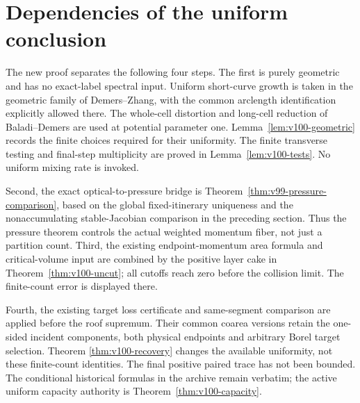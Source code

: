\section{Dependencies of the uniform conclusion}\label{app:v100-dependencies}
The new proof separates the following four steps. The first is purely
geometric and has no exact-label spectral input. Uniform short-curve
growth is taken in the geometric family of Demers--Zhang, with the
common arclength identification explicitly allowed there. The
whole-cell distortion and long-cell reduction of Baladi--Demers are
used at potential parameter one. Lemma~\ref{lem:v100-geometric}
records the finite choices required for their uniformity. The finite
transverse testing and final-step multiplicity are proved in
Lemma~\ref{lem:v100-tests}. No uniform mixing rate is invoked.

Second, the exact optical-to-pressure bridge is
Theorem~\ref{thm:v99-pressure-comparison}, based on the global
fixed-itinerary uniqueness and the nonaccumulating stable-Jacobian
comparison in the preceding section. Thus the pressure theorem
controls the actual weighted momentum fiber, not just a partition
count. Third, the existing endpoint-momentum area formula and
critical-volume input are combined by the positive layer cake in
Theorem~\ref{thm:v100-uncut}; all cutoffs reach zero before the
collision limit. The finite-count error is displayed there.

Fourth, the existing target loss certificate and same-segment
comparison are applied before the roof supremum. Their common
coarea versions retain the one-sided incident components, both
physical endpoints and arbitrary Borel target selection. Theorem
\ref{thm:v100-recovery} changes the available uniformity, not these
finite-count identities. The final positive paired trace has not
been bounded. The conditional historical formulas in the archive
remain verbatim; the active uniform capacity authority is
Theorem~\ref{thm:v100-capacity}.
